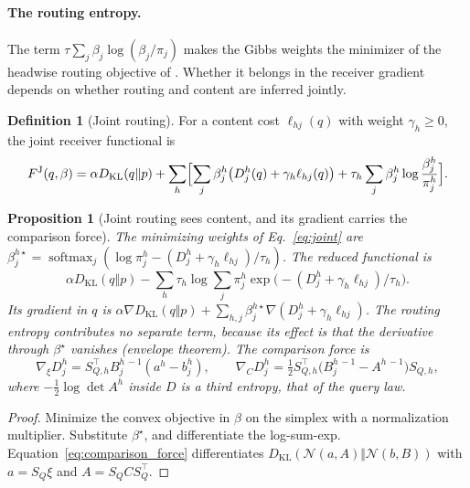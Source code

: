 \documentclass[11pt]{article}
\newtheorem{proposition}{Proposition}
\theoremstyle{definition}
\newtheorem{definition}{Definition}
\theoremstyle{remark}
\newcommand{\KL}{D_{\mathrm{KL}}}
\newcommand{\softmax}{\operatorname{softmax}}
\newcommand{\N}{\mathcal{N}}
\begin{document}
\paragraph{The routing entropy.}
The term $\tau\sum_j\beta_j\log(\beta_j/\pi_j)$ makes the Gibbs weights the minimizer of the headwise routing objective of \citet{dennis2026glk}. Whether it belongs in the receiver gradient depends on whether routing and content are inferred jointly.

\begin{definition}[Joint routing]
\label{def:joint}
For a content cost $\ell_{hj}(q)$ with weight $\gamma_h\ge0$, the joint receiver functional is
\begin{equation}
F^{\mathrm J}(q,\beta)=\alpha\KL(q\Vert p)+\sum_h\Bigl[\sum_j\beta_j^h\bigl(D_{j}^h(q)+\gamma_h\ell_{hj}(q)\bigr)+\tau_h\sum_j\beta_j^h\log\frac{\beta_j^h}{\pi_j^h}\Bigr].
\label{eq:joint}
\end{equation}
\end{definition}

\begin{proposition}[Joint routing sees content, and its gradient carries the comparison force]
\label{prop:joint}
The minimizing weights of Eq.~\eqref{eq:joint} are $\beta_j^{h\star}=\softmax_j(\log\pi_j^h-(D_j^h+\gamma_h\ell_{hj})/\tau_h)$. The reduced functional is
\[
\alpha\KL(q\Vert p)-\sum_h\tau_h\log\sum_j\pi_j^h\exp\bigl(-(D_j^h+\gamma_h\ell_{hj})/\tau_h\bigr).
\]
Its gradient in $q$ is $\alpha\nabla\KL(q\Vert p)+\sum_{h,j}\beta_j^{h\star}\nabla(D_j^h+\gamma_h\ell_{hj})$. The routing entropy contributes no separate term, because its effect is that the derivative through $\beta^\star$ vanishes (envelope theorem). The comparison force is
\begin{equation}
\nabla_\xi D_j^h=S_{Q,h}^\top B_j^{h\,-1}(a^h-b_j^h),\qquad
\nabla_CD_j^h=\tfrac12S_{Q,h}^\top\bigl(B_j^{h\,-1}-A^{h\,-1}\bigr)S_{Q,h},
\label{eq:comparison_force}
\end{equation}
where $-\tfrac12\log\det A^h$ inside $D$ is a third entropy, that of the query law.
\end{proposition}

\begin{proof}
Minimize the convex objective in $\beta$ on the simplex with a normalization multiplier. Substitute $\beta^\star$, and differentiate the log-sum-exp. Equation~\eqref{eq:comparison_force} differentiates $\KL(\N(a,A)\Vert\N(b,B))$ with $a=S_Q\xi$ and $A=S_QCS_Q^\top$.
\end{proof}
\end{document}
